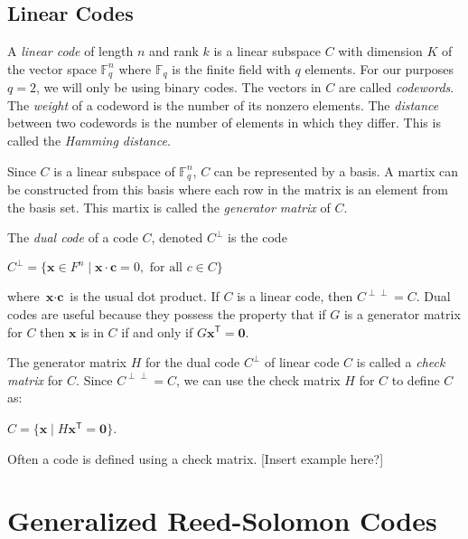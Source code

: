 \documentclass{article}
\begin{document}
\subsection{Linear Codes}
A \textit{linear code} of length $n$ and rank $k$ is a linear subspace $C$ with dimension $K$ of the vector space $\mathbb{F}^{n}_{q}$ where $\mathbb{F}_{q}$ is the finite field with $q$ elements. For our purposes $q = 2$, we will only be using binary codes. The vectors in $C$ are called \textit{codewords}. The \textit{weight} of a codeword is the number of its nonzero elements. The \textit{distance} between two codewords is the number of elements in which they differ. This is called the \textit{Hamming distance}.

Since $C$ is a linear subspace of $\mathbb{F}^{n}_{q}$, $C$ can be represented by a basis. A martix can be constructed from this basis where each row in the matrix is an element from the basis set. This martix is called the \textit{generator matrix} of $C$.

The \textit{dual code} of a code $C$, denoted $C^{\perp}$ is the code
\begin{center}
$C^{\perp} = \{\textbf{x} \in F^{n} \mid \textbf{x} \cdot \textbf{c} = 0, \text{ for all } c \in C\}$
\end{center}
where $\textbf{x} \cdot \textbf{c}$ is the usual dot product. If $C$ is a linear code, then $C^{\perp \perp} = C$. Dual codes are useful because they possess the property that if $G$ is a generator matrix for $C$ then $\textbf{x}$ is in $C$ if and only if $G\textbf{x}^{\mathsf{T}} = \textbf{0}$.

The generator matrix $H$ for the dual code $C^{\perp}$ of linear code $C$ is called a \textit{check matrix} for $C$. Since $C^{\perp \perp} = C$, we can use the check matrix $H$ for $C$ to define $C$ as:
\begin{center}
$C = \{\textbf{x} \mid H\textbf{x}^{\mathsf{T}} = \textbf{0}\}$.
\end{center}
Often a code is defined using a check matrix. [Insert example here?]

\section{Generalized Reed-Solomon Codes}
\end{document}

